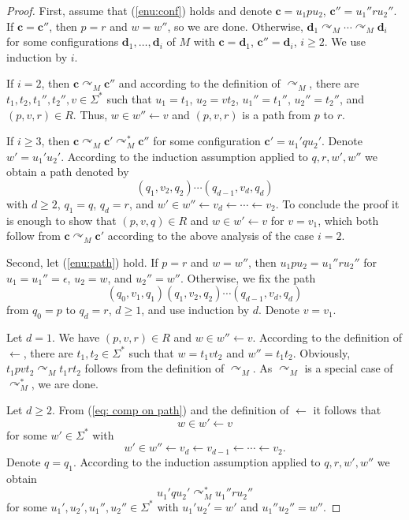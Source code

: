 \documentclass{ws-ijmpc}
\begin{document}
\begin{proof}
First, assume that (\ref{enu:conf}) holds and denote $\mathbf{c}=u_{1}pu_{2}$,
$\mathbf{c}''=u_{1}''ru_{2}''$. If $\mathbf{c}=\mathbf{c}''$, then
$p=r$ and $w=w''$, so we are done. Otherwise, $\mathbf{d}_{1}\curvearrowright_{M}\cdots\curvearrowright_{M}\mathbf{d}_{i}$
for some configurations $\mathbf{d}_{1},\dots,\mathbf{d}_{i}$ of
$M$ with $\mathbf{c}=\mathbf{d}_{1}$, $\mathbf{c}''=\mathbf{d}_{i}$,
$i\ge2$. We use induction by $i$. 

If $i=2$, then $\mathbf{c}\curvearrowright_{M}\mathbf{c}''$ and
according to the definition of $\curvearrowright_{M}$, there are
$t_{1},t_{2},t_{1}'',t_{2}'',v\in\Sigma^{*}$ such that $u_{1}=t_{1}$,
$u_{2}=vt_{2}$, $u_{1}''=t_{1}''$, $u_{2}''=t_{2}''$, and $(p,v,r)\in R$.
Thus, $w\in w''\leftarrow v$ and $\left(p,v,r\right)$ is a path
from $p$ to $r$.

If $i\ge3$, then $\mathbf{c}\curvearrowright_{M}\mathbf{c}'\curvearrowright_{M}^{*}\mathbf{c}''$
for some configuration $\mathbf{c}'=u_{1}'qu_{2}'$. Denote $w'=u_{1}'u_{2}'$.
According to the induction assumption applied to $q,r,w',w''$ we
obtain a path denoted by 
\[
\left(q_{1},v_{2},q_{2}\right)\cdots\left(q_{d-1},v_{d},q_{d}\right)
\]
with $d\ge2$, $q_{1}=q$, $q_{d}=r$, and $w'\in w''\leftarrow v_{d}\leftarrow\cdots\leftarrow v_{2}$.
To conclude the proof it is enough to show that $\left(p,v,q\right)\in R$
and $w\in w'\leftarrow v$ for $v=v_{1}$, which both follow from
$\mathbf{c}\curvearrowright_{M}\mathbf{c}'$ according to the above
analysis of the case $i=2$. 

Second, let (\ref{enu:path}) hold. If $p=r$ and $w=w''$, then $u_{1}pu_{2}=u_{1}''ru_{2}''$
for $u_{1}=u_{1}''=\epsilon$, $u_{2}=w$, and $u_{2}''=w''$. Otherwise,
we fix the path 
\[
\left(q_{0},v_{1},q_{1}\right)\left(q_{1},v_{2},q_{2}\right)\cdots\left(q_{d-1},v_{d},q_{d}\right)
\]
from $q_{0}=p$ to $q_{d}=r$, $d\ge1$, and use induction by $d$.
Denote $v=v_{1}$. 

Let $d=1$. We have $\left(p,v,r\right)\in R$ and $w\in w''\leftarrow v$.
According to the definition of $\leftarrow$, there are $t_{1},t_{2}\in\Sigma^{*}$
such that $w=t_{1}vt_{2}$ and $w''=t_{1}t_{2}$. Obviously, $t_{1}pvt_{2}\curvearrowright_{M}t_{1}rt_{2}$
follows from the definition of $\curvearrowright_{M}$. As $\curvearrowright_{M}$
is a special case of $\curvearrowright_{M}^{*}$, we are done. 

Let $d\ge2$. From (\ref{eq: comp on path}) and the definition of
$\leftarrow$ it follows that 
\begin{equation}
w\in w'\leftarrow v\label{eq: prv}
\end{equation}
for some $w'\in\Sigma^{*}$ with 
\begin{equation}
w'\in w''\leftarrow v_{d}\leftarrow v_{d-1}\leftarrow\cdots\leftarrow v_{2}.\label{eq: zby}
\end{equation}
Denote $q=q_{1}$. According to the induction assumption applied to
$q,r,w',w''$ we obtain 
\[
u_{1}'qu_{2}'\curvearrowright_{M}^{*}u_{1}''ru_{2}''
\]
for some $u_{1}',u_{2}',u_{1}'',u_{2}''\in\Sigma^{*}$ with $u_{1}'u_{2}'=w'$
and $u_{1}''u_{2}''=w''$.


\end{proof}
\end{document}

